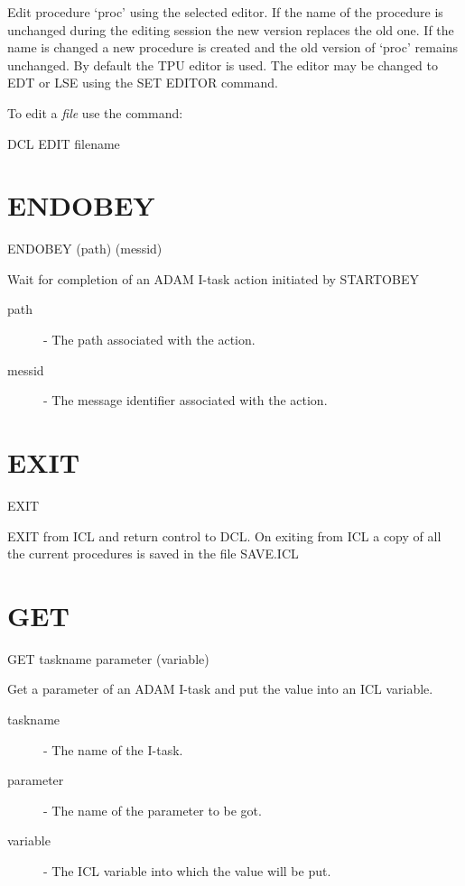  Edit procedure `proc' using the selected editor. If the name of the
 procedure is unchanged during the editing session the new version
 replaces the old one. If the name is changed a new procedure is
 created and the old version of `proc' remains unchanged. By default 
 the TPU editor is used. The editor may be changed to EDT or LSE
 using the SET EDITOR command.

 To edit a {\em file} use the command:

    DCL EDIT filename

\section{ENDOBEY}

   ENDOBEY \hspace{.5cm} (path) \hspace{.5cm} (messid)

 Wait for completion of an ADAM I-task action initiated by STARTOBEY

\begin{description}

\item[path]  -  The path associated with the action.

\item[messid]  -  The message identifier associated with the action.

\end{description}

\section{EXIT}

   EXIT

 EXIT from ICL and return control to DCL. On exiting from ICL a
 copy of all the current procedures is saved in the file SAVE.ICL

\section{GET}

   GET \hspace{.5cm} taskname \hspace{.5cm} parameter \hspace{.5cm} (variable)

 Get a parameter of an ADAM I-task and put the value into an ICL variable.

\begin{description}

\item[taskname] - The name of the I-task.

\item[parameter] - The name of the parameter to be got.

\item[variable] - The ICL variable into which the value will be put.

\end{description}


